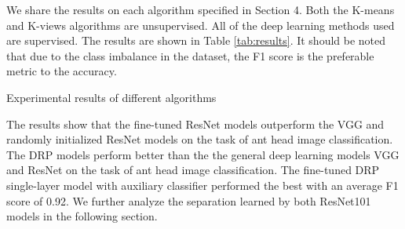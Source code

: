 \documentclass{aci}
\numberwithin{equation}{section}
\begin{document}

We share the results on each algorithm specified in Section 4. Both the K-means
and K-views algorithms are unsupervised. All of the deep learning methods used
are supervised. The results are shown in Table \ref{tab:results}. It should be
noted that due to the class imbalance in the dataset, the F1 score is the
preferable metric to the accuracy.

\begin{table}[h]
    \centering
    \caption{Experimental results of different algorithms}
    
    \label{tab:results}
\end{table}

\FloatBarrier

The results show that the fine-tuned ResNet models outperform the VGG and
randomly initialized ResNet models on the task of ant head image classification.
The DRP models perform better than the the general deep learning models VGG and
ResNet on the task of ant head image classification. The fine-tuned DRP
single-layer model with auxiliary classifier performed the best with an average
F1 score of 0.92. We further analyze the separation learned by both ResNet101
models in the following section.



\end{document}
